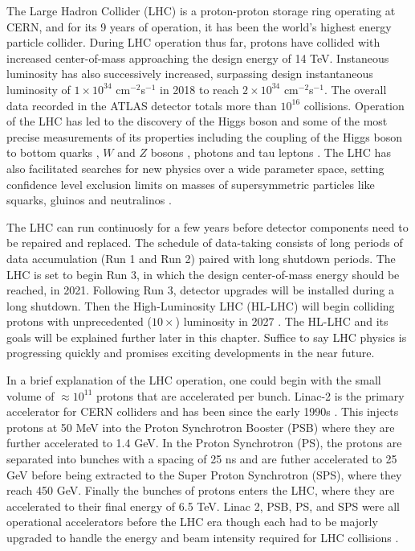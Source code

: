  
The Large Hadron Collider (LHC) is a proton-proton storage ring operating at CERN, and for its 9 years of operation, it has been the world's highest energy particle collider. 
During LHC operation thus far, protons have collided with increased center-of-mass approaching the design energy of 14 TeV. Instaneous luminosity has also successively increased, surpassing design instantaneous luminosity of $1\times10^{34}$ cm$^{-2}$s$^{-1}$ in 2018 to reach $2\times10^{34}$ cm$^{-2}$s$^{-1}$\cite{CERNnews1}. The overall data recorded in the ATLAS detector totals more than $10^{16}$ collisions. Operation of the LHC has led to the discovery of the Higgs boson and some of the most precise measurements of its properties including the coupling of the Higgs boson to bottom quarks \cite{Aaboud_2018_0}, $W$ and $Z$ bosons \cite{Aaboud_2019, Aaboud_2018}, photons \cite{Aaboud_2018_2} and tau leptons \cite{Aaboud_2019_2}. The LHC has also facilitated searches for new physics over a wide parameter space, setting confidence level exclusion limits on masses of supersymmetric particles like squarks, gluinos and neutralinos \cite{ATLAS-CONF-2019-040}. 

The LHC can run continuosly for a few years before detector components need to be repaired and replaced. The schedule of data-taking consists of long periods of data accumulation (Run 1 and Run 2) paired with long shutdown periods. The LHC is set to begin Run 3, in which the design center-of-mass energy should be reached, in 2021. Following Run 3, detector upgrades will be installed during a long shutdown. Then the High-Luminosity LHC (HL-LHC) will begin colliding protons with unprecedented ($10\times$) luminosity in 2027 \cite{CERNnews2}. The HL-LHC and its goals will be explained further later in this chapter. Suffice to say LHC physics is progressing quickly and promises exciting developments in the near future. 

In a brief explanation of the LHC operation, one could begin with the small volume of $\approx 10^{11}$ protons that are accelerated per bunch. Linac-2 is the primary accelerator for CERN colliders and has been since the early 1990s \cite{LHCInjector}. This injects protons at 50 MeV into the Proton Synchrotron Booster (PSB) where they are further accelerated to 1.4 GeV. In the Proton Synchrotron (PS), the protons are separated into bunches with a spacing of 25 ns and are futher accelerated to 25 GeV before being extracted to the Super Proton Synchrotron (SPS), where they reach 450 GeV. Finally the bunches of protons enters the LHC, where they are accelerated to their final energy of 6.5 TeV. Linac 2, PSB, PS, and SPS were all operational accelerators before the LHC era though each had to be majorly upgraded to handle the energy and beam intensity required for LHC collisions \cite{LHCInjector}. 


